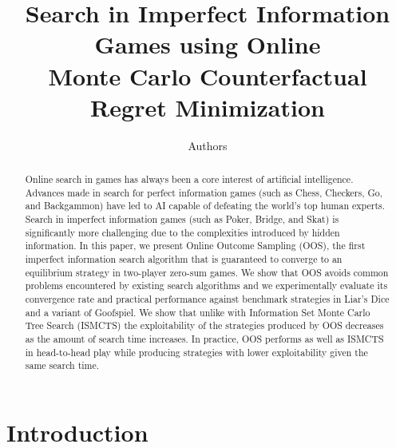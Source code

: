 \documentclass[letterpaper]{article}
\begin{document}
%
\title{Search in Imperfect Information Games using Online\\Monte Carlo Counterfactual Regret Minimization}
\author{Authors}


\maketitle

\begin{abstract}
Online search in games has always been a core interest of artificial intelligence. 
Advances made in search for perfect information games (such as Chess, Checkers, Go, 
and Backgammon) have led to AI capable of defeating the world's top human experts. 
Search in imperfect information games (such as Poker, Bridge, and Skat) is significantly 
more challenging due to the complexities introduced by hidden information. In this 
paper, we present Online Outcome Sampling (OOS), the first imperfect information 
search algorithm that is guaranteed to converge to an equilibrium strategy in two-player 
zero-sum games. We show that OOS avoids common problems encountered by existing 
search algorithms and we experimentally evaluate its convergence rate and practical 
performance against benchmark strategies in Liar's Dice and a variant of Goofspiel. 
We show that unlike with Information Set Monte Carlo Tree Search (ISMCTS) the 
exploitability of the strategies produced by OOS decreases as the amount of search 
time increases. In practice, OOS performs as well as ISMCTS in head-to-head play 
while producing strategies with lower exploitability given the same search time.
\end{abstract}

\section{Introduction}

\end{document}
